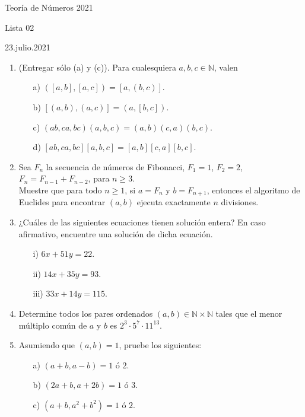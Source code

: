 \documentclass{article}
\newcommand {\bc}{\begin{center}}
\newcommand {\ec}{\end{center}}
\newcommand{\NN}{\mathbb{N}}
\begin{document}
\begin{sf}
\bc{\Large Teoría de Números 2021} \ec
\bc{Lista 02} \ec
\bc{23.julio.2021} \ec

\bigskip

\begin{enumerate}


\item
(Entregar sólo (a) y (c)). Para cualesquiera $a, b, c \in \NN$, valen
\begin{multicols}{2}
\begin{itemize}
	\item[a)] $([a, b], [a, c]) = [a, (b,c)]$.
	\item[b)] $[(a, b), (a, c)] = (a, [b,c])$.
	\item[c)] $(ab,ca,bc)(a,b,c) = (a,b)(c,a)(b,c)$.
	\item[d)] $[ab,ca,bc][a,b,c] = [a,b][c,a][b,c]$.
\end{itemize}
\end{multicols}

\bigskip


\item
	Sea $F_n$ la secuencia de números de Fibonacci, $F_1=1$, $F_2=2$, $F_n = F_{n-1} + F_{n-2}$, para $n \geq 3$. \\
	Muestre que para todo $n \geq 1$, si $a = F_n$ y $b = F_{n+1}$, entonces el algoritmo de Euclides para encontrar $(a,b)$ ejecuta exactamente $n$ divisiones.

\bigskip


\item
¿Cuáles de las siguientes ecuaciones tienen solución entera? En caso afirmativo, encuentre una solución de dicha ecuación.
\begin{itemize}
	\item[i)] $6x + 51y = 22$.
	\item[ii)] $14x + 35y = 93$.
	\item[iii)] $33x + 14y = 115$.
\end{itemize}
\bigskip


\item
Determine todos los pares ordenados $(a,b) \in \NN \times \NN$ tales que el menor múltiplo común de $a$ y $b$ es $2^3 \cdot 5^7 \cdot 11^{13}$.

\bigskip


\item
Asumiendo que $(a, b) = 1$, pruebe los siguientes:
\begin{itemize}
	\item[a)] $(a + b, a - b) = 1$ ó $2$.
	\item[b)] $(2a + b, a+ 2b) = 1$ ó $3$.
	\item[c)] $(a + b, a^2 + b^2) = 1$ ó $2$.
\end{itemize}


\end{enumerate}
\end{sf}
\end{document}
